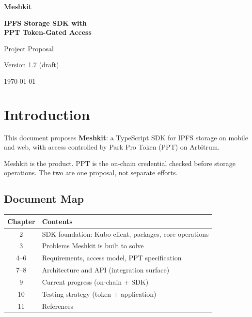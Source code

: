 \documentclass[11pt,a4paper,openany]{report}
\begin{document}
\begin{titlepage}
  \centering
  \vspace*{2cm}
  {\large\bfseries Meshkit\par}
  \vspace{1cm}
  {\LARGE\bfseries IPFS Storage SDK with\\PPT Token-Gated Access\par}
  \vspace{1.2cm}
  {\large Project Proposal\par}
  \vspace{0.6cm}
  {\normalsize Version 1.7 (draft)\par}
  \vfill
  {\normalsize \today\par}
\end{titlepage}

\tableofcontents
\clearpage
{}

\chapter{Introduction}

This document proposes \textbf{Meshkit}: a TypeScript SDK for IPFS storage on mobile and web, with access controlled by Park Pro Token (PPT) on Arbitrum.

Meshkit is the product. PPT is the on-chain credential checked before storage operations. The two are one proposal, not separate efforts.

\section{Document Map}

\begin{center}
\small
\begin{tabular}{@{}cl@{}}
\toprule
\textbf{Chapter} & \textbf{Contents} \\
\midrule
2 & SDK foundation: Kubo client, packages, core operations \\
3 & Problems Meshkit is built to solve \\
4--6 & Requirements, access model, PPT specification \\
7--8 & Architecture and API (integration surface) \\
9 & Current progress (on-chain + SDK) \\
10 & Testing strategy (token + application) \\
11 & References \\
\bottomrule
\end{tabular}
\end{center}
\end{document}
